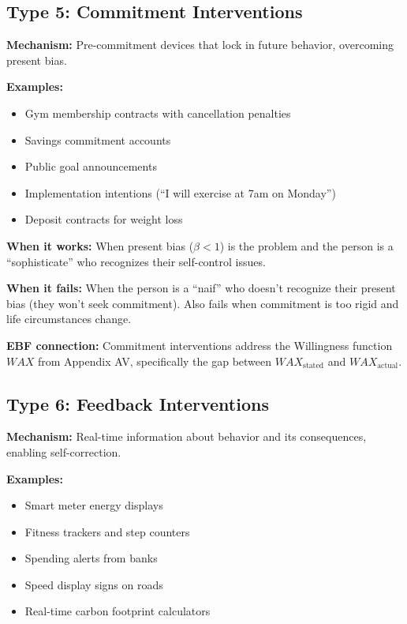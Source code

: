 \subsection{Type 5: Commitment Interventions}

\textbf{Mechanism:} Pre-commitment devices that lock in future behavior, overcoming present bias.

\textbf{Examples:}
\begin{itemize}[nosep]
\item Gym membership contracts with cancellation penalties
\item Savings commitment accounts \citep{ashraf2006}
\item Public goal announcements
\item Implementation intentions (``I will exercise at 7am on Monday'')
\item Deposit contracts for weight loss
\end{itemize}

\textbf{When it works:} When present bias ($\beta < 1$) is the problem and the person is a ``sophisticate'' who recognizes their self-control issues.

\textbf{When it fails:} When the person is a ``naif'' who doesn't recognize their present bias (they won't seek commitment). Also fails when commitment is too rigid and life circumstances change.

\textbf{EBF connection:} Commitment interventions address the Willingness function $WAX$ from Appendix AV, specifically the gap between $WAX_{\text{stated}}$ and $WAX_{\text{actual}}$.

\subsection{Type 6: Feedback Interventions}

\textbf{Mechanism:} Real-time information about behavior and its consequences, enabling self-correction.

\textbf{Examples:}
\begin{itemize}[nosep]
\item Smart meter energy displays
\item Fitness trackers and step counters
\item Spending alerts from banks
\item Speed display signs on roads
\item Real-time carbon footprint calculators
\end{itemize}

